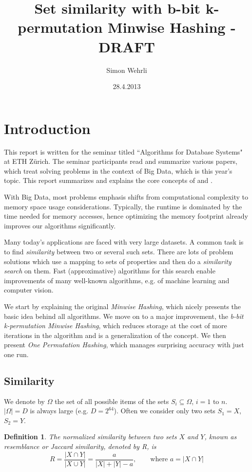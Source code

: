 \documentclass[a4paper]{article}
\author{Simon Wehrli}
\date{28.4.2013}
\title{Set similarity with b-bit k-permutation Minwise Hashing - DRAFT}
\newtheorem{mydef}{Definition}
\begin{document}
 
\maketitle

\section{Introduction}
This report is written for the seminar titled ``Algorithms for Database Systems" at ETH Z\"{u}rich. The seminar participants read and summarize various papers, which treat solving problems in the context of Big Data, which is this year's topic. This report summarizes and explains the core concepts of \citep{LiK11} and \citep{LiOwZhang12}.

With Big Data, most problems emphasis shifts from computational complexity to memory space usage considerations. Typically, the runtime is dominated by the time needed for memory accesses, hence optimizing the memory footprint already improves our algorithms significantly. 

Many today's applications are faced with very large datasets. A common task is to find \emph{similarity} between two or several such sets. There are lots of problem solutions which use a mapping to sets of properties and then do a \emph{similarity search} on them. Fast (approximative) algorithms for this search enable improvements of many well-known algorithms, e.g. of machine learning and computer vision.

We start by explaining the original \emph{Minwise Hashing}, which nicely presents the basic idea behind all algorithms. We move on to a major improvement, the \emph{b-bit k-permutation Minwise Hashing}, which reduces storage at the cost of more iterations in the algorithm and is a generalization of the concept. We then present \emph{One Permutation Hashing}, which manages surprising accuracy with just one run.

\subsection{Similarity}
We denote by $\Omega$ the set of all possible items of the sets $S_i \subseteq \Omega$, $i = 1 \text{ to } n$. $\left| \Omega \right| = D$ is always large (e.g. $D=2^{64}$). Often we consider only two sets $S_1 = X$, $S_2 = Y$.
\begin{framed}
\begin{mydef}\label{def:jaccard}
The normalized similarity between two sets $X$ and $Y$, known as \emph{resemblance} or \emph{Jaccard similarity}, denoted by R, is
\begin{equation}
R=\frac{\left| X \cap Y \right|}{\left| X \cup Y \right|} = \frac{a}{\left| X \right| + \left| Y \right| -a}, \qquad \text{where } a=\left| X \cap Y \right|
\end{equation}
\end{mydef}
\end{framed}
\end{document}
